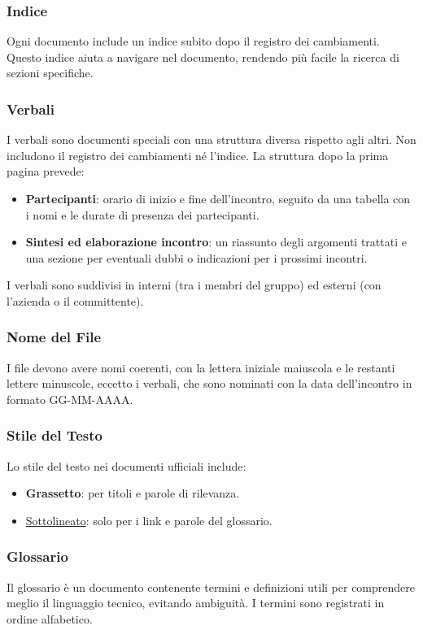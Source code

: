 \subsubsection*{Indice}
Ogni documento include un indice subito dopo il registro dei cambiamenti. 
Questo indice aiuta a navigare nel documento, rendendo più facile la ricerca di sezioni specifiche.

\subsubsection{Verbali}
I verbali sono documenti speciali con una struttura diversa rispetto agli altri. Non includono il registro dei cambiamenti né l'indice.
La struttura dopo la prima pagina prevede:
\begin{itemize}
    \item \textbf{Partecipanti}: orario di inizio e fine dell'incontro, seguito da una tabella con i nomi e le durate di presenza dei partecipanti.
    \item \textbf{Sintesi ed elaborazione incontro}: un riassunto degli argomenti trattati e una sezione per eventuali dubbi o indicazioni per i prossimi incontri.
\end{itemize}
I verbali sono suddivisi in interni (tra i membri del gruppo) ed esterni (con l'azienda o il committente).


\subsubsection{Nome del File}
I file devono avere nomi coerenti, con la lettera iniziale maiuscola e le restanti lettere minuscole, 
eccetto i verbali, che sono nominati con la data dell'incontro in formato GG-MM-AAAA.

\subsubsection{Stile del Testo}
Lo stile del testo nei documenti ufficiali include:
\begin{itemize}
    \item \textbf{Grassetto}: per titoli e parole di rilevanza.
    \item \underline{Sottolineato}: solo per i link e parole del glossario.
\end{itemize}

\subsubsection{Glossario}
Il glossario è un documento contenente termini e definizioni utili per comprendere meglio il linguaggio tecnico, evitando ambiguità. 
I termini sono registrati in ordine alfabetico.


